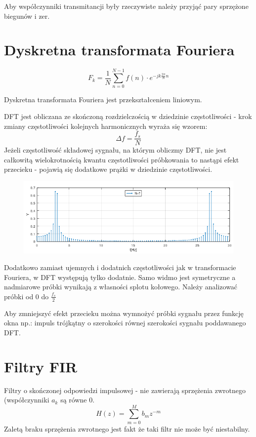 \documentclass[11pt]{article}
\begin{document}
Aby współczynniki transmitancji były rzeczywiste należy przyjąć pary sprzężone biegunów i zer.

\section{Dyskretna transformata Fouriera}
\[ F_k = \frac{1}{N} \sum_{n=0}^{N-1}f(n)\cdot e^{-jk\frac{2\pi}{N}n} \]

Dyskretna transformata Fouriera jest przekształceniem liniowym.

DFT jest obliczana ze skończoną rozdzielczością w dziedzinie częstotliwości - krok zmiany częstotliwości kolejnych harmonicznych wyraża się wzorem:
\[ \Delta f=\frac{f_s}{N} \]
Jeżeli częstotliwość składowej sygnału, na którym obliczmy DFT, nie jest całkowitą wielokrotnością kwantu częstotliwości próbkowania to nastąpi efekt przecieku - pojawią się dodatkowe prążki w dziedzinie częstotliwości.
\begin{figure}[h]
    \centering
    \includegraphics[width=15cm]{przeciek.png}
\end{figure}

Dodatkowo zamiast ujemnych i dodatnich częstotliwości jak w transformacie Fouriera, w DFT występują tylko dodatnie. Samo widmo jest symetryczne a nadmiarowe próbki wynikają z własności splotu kołowego. Należy analizować próbki od 0 do $\frac{f_s}{2}$

Aby zmniejszyć efekt przecieku można wymnożyć próbki sygnału przez funkcję okna np.: impuls trójkątny o szerokości równej szerokości sygnału poddawanego DFT.

\section{Filtry FIR}
Filtry o skończonej odpowiedzi impulsowej - nie zawierają sprzężenia zwrotnego (współczynniki $a_k$ są równe 0.
\[ H(z) = \sum_{m=0}^{M}b_m z^{-m} \]
Zaletą braku sprzężenia zwrotnego jest fakt że taki filtr nie może być niestabilny.
\end{document}
